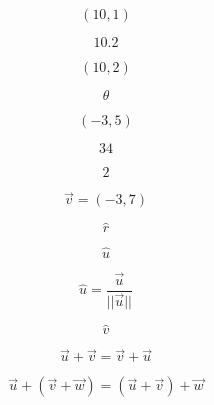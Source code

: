 \documentclass[12pt, a4paper]{article}
\begin{document}
\begin{equation}
\label{tenone}
(10, 1)
\end{equation}

\begin{equation}
\label{tenpointtwo}
10.2
\end{equation}

\begin{equation}
\label{tentwo}
(10, 2)
\end{equation}

\begin{equation}
\label{theta}
\theta
\end{equation}

\begin{equation}
\label{threefive}
(-3, 5)
\end{equation}

\begin{equation}
\label{threefour}
34
\end{equation}

\begin{equation}
\label{two}
2
\end{equation}

\begin{equation}
\label{unequals}
\vec{v} = (-3, 7)
\end{equation}

\begin{equation}
\label{unitr}
\hat{r}
\end{equation}

\begin{equation}
\label{unitu}
\hat{u}
\end{equation}

\begin{equation}
\label{unituformula}
\hat{u} = \frac{\vec{u}}{||\vec{u}||}
\end{equation}

\begin{equation}
\label{unitv}
\hat{v}
\end{equation}

\begin{equation}
\label{uplusvvplusu}
\vec{u} + \vec{v} = \vec{v} + \vec{u}
\end{equation}

\begin{equation}
\label{uplusvwuvplusw}
\vec{u} + (\vec{v} + \vec{w}) = (\vec{u} + \vec{v}) + \vec{w}
\end{equation}
\end{document}
